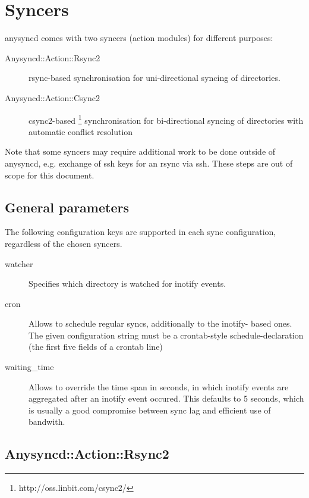 \section{Syncers}
\label{sec:syncers}

anysyncd comes with two syncers (action modules) for different purposes:

\begin{description}
    \item[Anysyncd::Action::Rsync2] rsync-based synchronisation for
    uni-directional syncing of directories.  
    \item[Anysyncd::Action::Csync2] csync2-based
    \footnote{http://oss.linbit.com/csync2/} synchronisation for bi-directional
    syncing of directories with automatic conflict resolution
\end{description}

Note that some syncers may require additional work to be done outside of
anysyncd, e.g. exchange of ssh keys for an rsync via ssh. These steps are out
of scope for this document.

\subsection{General parameters}
\label{ssec:syncer-general}
The following configuration keys are supported in each sync configuration,
regardless of the chosen syncers.

\begin{description}
    \item[watcher] Specifies which directory is watched for inotify events.

    \item[cron] Allows to schedule regular syncs, additionally to the inotify-
        based ones. The given configuration string must be a crontab-style
        schedule-declaration (the first five fields of a crontab line)
    \item[waiting_time] Allows to override the time span in seconds, in which
        inotify events are aggregated after an inotify event occured. This
        defaults to 5 seconds, which is usually a good compromise between
        sync lag and efficient use of bandwith.
\end{description}

\subsection{Anysyncd::Action::Rsync2}

